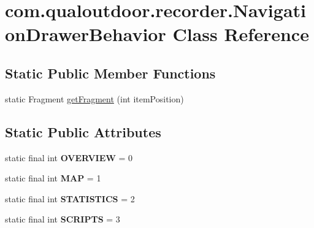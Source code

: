 \hypertarget{classcom_1_1qualoutdoor_1_1recorder_1_1NavigationDrawerBehavior}{\section{com.\-qualoutdoor.\-recorder.\-Navigation\-Drawer\-Behavior Class Reference}
\label{classcom_1_1qualoutdoor_1_1recorder_1_1NavigationDrawerBehavior}
}
\subsection*{Static Public Member Functions}
\begin{DoxyCompactItemize}
\item 
static Fragment \hyperlink{classcom_1_1qualoutdoor_1_1recorder_1_1NavigationDrawerBehavior_a56dc43a69769960a5d12f05e0c89abdd}{get\-Fragment} (int item\-Position)
\end{DoxyCompactItemize}
\subsection*{Static Public Attributes}
\begin{DoxyCompactItemize}
\item 
\hypertarget{classcom_1_1qualoutdoor_1_1recorder_1_1NavigationDrawerBehavior_a71fe6af02c85ff204a66b60abe212024}{static final int {\bfseries O\-V\-E\-R\-V\-I\-E\-W} = 0}\label{classcom_1_1qualoutdoor_1_1recorder_1_1NavigationDrawerBehavior_a71fe6af02c85ff204a66b60abe212024}

\item 
\hypertarget{classcom_1_1qualoutdoor_1_1recorder_1_1NavigationDrawerBehavior_aebe294104d68571c1eb4ce9af9d65178}{static final int {\bfseries M\-A\-P} = 1}\label{classcom_1_1qualoutdoor_1_1recorder_1_1NavigationDrawerBehavior_aebe294104d68571c1eb4ce9af9d65178}

\item 
\hypertarget{classcom_1_1qualoutdoor_1_1recorder_1_1NavigationDrawerBehavior_a8368f632c82d3eff9da1fc2e729c2bce}{static final int {\bfseries S\-T\-A\-T\-I\-S\-T\-I\-C\-S} = 2}\label{classcom_1_1qualoutdoor_1_1recorder_1_1NavigationDrawerBehavior_a8368f632c82d3eff9da1fc2e729c2bce}

\item 
\hypertarget{classcom_1_1qualoutdoor_1_1recorder_1_1NavigationDrawerBehavior_adfb5f8a3ab94d190d16e7dfb5004dc4b}{static final int {\bfseries S\-C\-R\-I\-P\-T\-S} = 3}\label{classcom_1_1qualoutdoor_1_1recorder_1_1NavigationDrawerBehavior_adfb5f8a3ab94d190d16e7dfb5004dc4b}

\end{DoxyCompactItemize}


